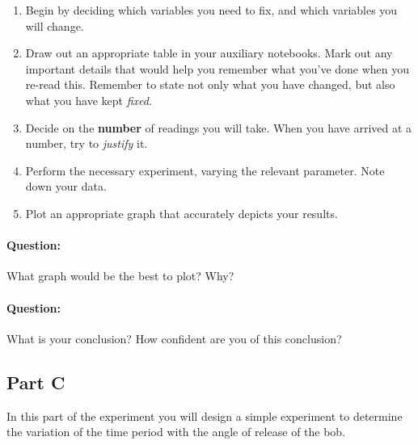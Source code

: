 \begin{enumerate}
    \item Begin by deciding which variables you need to fix, and which variables you will change.
    
    \item Draw out an appropriate table in your auxiliary notebooks. Mark out any important details that would help you remember what you've done when you re-read this. Remember to state not only what you have changed, but also what you have kept \textit{fixed}.
    
    \item Decide on the \textbf{number} of readings you will take. When you have arrived at a number, try to \textit{justify} it.
    
    \item Perform the necessary experiment, varying the relevant parameter. Note down your data.
    
    \item Plot an appropriate graph that accurately depicts your results.
\end{enumerate}


\begin{question}
\paragraph{Question:} What graph would be the best to plot? Why? ~\\

\paragraph{Question:} What is your conclusion? How confident are you of this conclusion?
\end{question}

\subsection{Part C}

In this part of the experiment you will design a simple experiment to determine the variation of the time period with the angle of release of the bob.

